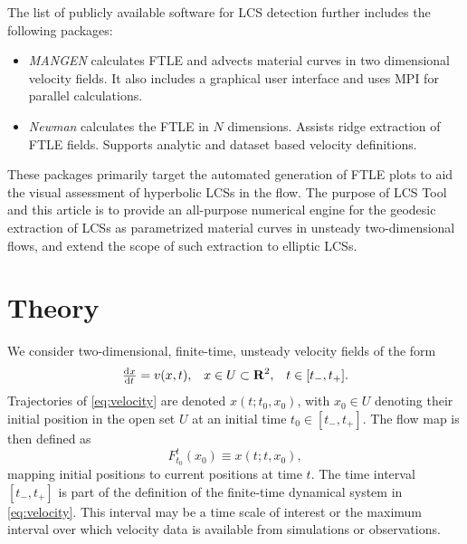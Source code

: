 \documentclass{elsarticle}
\begin{document}
The list of publicly available software for LCS detection further
includes the following packages:
\begin{itemize}
\item \emph{MANGEN}\citep{lekien03:_time} calculates FTLE and advects material curves in two dimensional velocity fields. It also includes a graphical user interface and uses MPI for parallel calculations.
\item \emph{Newman}\citep{toit10:_trans} calculates the FTLE in $N$ dimensions. Assists ridge extraction of FTLE fields. Supports analytic  and dataset based velocity definitions.
\end{itemize}
These packages primarily target the automated generation of FTLE plots to aid the visual assessment of hyperbolic LCSs in the flow. The purpose of LCS Tool and this article is to provide an all-purpose numerical engine for the geodesic extraction of LCSs as parametrized material curves in unsteady two-dimensional flows, and extend the scope of such extraction to elliptic LCSs.

\section{Theory}

We consider two-dimensional, finite-time, unsteady velocity fields of the form
\begin{align}
\od{x}{t} = v(x,t), && x \in U \subset \mathbf R^2, && t \in [t_-,t_+].
\label{eq:velocity}
\end{align}
Trajectories of \cref{eq:velocity} are denoted $x(t;t_0,x_0)$, with $x_0 \in U$ denoting their initial position in the open set $U$ at an initial time $t_0 \in [t_-,t_+]$. The flow map is then defined as
\[
F_{t_0}^t(x_0) \equiv x(t;t,x_0),
\]
mapping initial positions to current positions at time $t$. The time interval $[t_-,t_+]$ is part of the definition of the finite-time dynamical system in \cref{eq:velocity}. This interval may be a time scale of interest or the maximum interval over which velocity data is available from simulations or observations.
\end{document}
